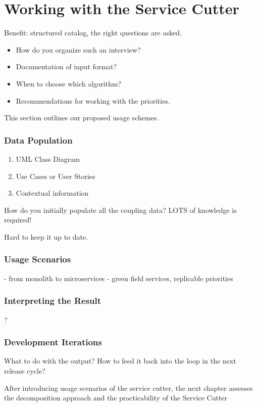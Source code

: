 \chapter{Working with the Service Cutter} 

Benefit: structured catalog, the right questions are asked.


\begin{itemize}
	\item How do you organize such an interview?
	\item Documentation of input format?
	\item When to choose which algorithm?
	\item Recommendations for working with the priorities.
\end{itemize}

This section outlines our proposed usage schemes.

\subsection{Data Population}

\begin{enumerate}
	\item UML Class Diagram
	\item Use Cases or User Stories
	\item Contextual information
\end{enumerate}

How do you initially populate all the coupling data? LOTS of knowledge is required!

Hard to keep it up to date.

\subsection{Usage Scenarios}

- from monolith to microservices
- green field services, replicable priorities

\subsection{Interpreting the Result}

?
\subsection{Development Iterations}

What to do with the output? How to feed it back into the loop in the next release cycle?


After introducing usage scenarios of the service cutter, the next chapter assesses the decomposition approach and the practicability of the Service Cutter